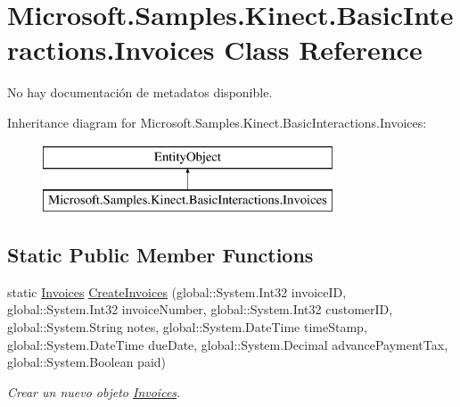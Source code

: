 \hypertarget{class_microsoft_1_1_samples_1_1_kinect_1_1_basic_interactions_1_1_invoices}{\section{Microsoft.\-Samples.\-Kinect.\-Basic\-Interactions.\-Invoices Class Reference}
\label{class_microsoft_1_1_samples_1_1_kinect_1_1_basic_interactions_1_1_invoices}
}


No hay documentación de metadatos disponible.  


Inheritance diagram for Microsoft.\-Samples.\-Kinect.\-Basic\-Interactions.\-Invoices\-:\begin{figure}[H]
\begin{center}
\leavevmode
\includegraphics[height=2.000000cm]{class_microsoft_1_1_samples_1_1_kinect_1_1_basic_interactions_1_1_invoices}
\end{center}
\end{figure}
\subsection*{Static Public Member Functions}
\begin{DoxyCompactItemize}
\item 
static \hyperlink{class_microsoft_1_1_samples_1_1_kinect_1_1_basic_interactions_1_1_invoices}{Invoices} \hyperlink{class_microsoft_1_1_samples_1_1_kinect_1_1_basic_interactions_1_1_invoices_a97af772a2dc270e5182bc0208bbf6f87}{Create\-Invoices} (global\-::\-System.\-Int32 invoice\-I\-D, global\-::\-System.\-Int32 invoice\-Number, global\-::\-System.\-Int32 customer\-I\-D, global\-::\-System.\-String notes, global\-::\-System.\-Date\-Time time\-Stamp, global\-::\-System.\-Date\-Time due\-Date, global\-::\-System.\-Decimal advance\-Payment\-Tax, global\-::\-System.\-Boolean paid)
\begin{DoxyCompactList}\small\item\em Crear un nuevo objeto \hyperlink{class_microsoft_1_1_samples_1_1_kinect_1_1_basic_interactions_1_1_invoices}{Invoices}. \end{DoxyCompactList}\end{DoxyCompactItemize}
